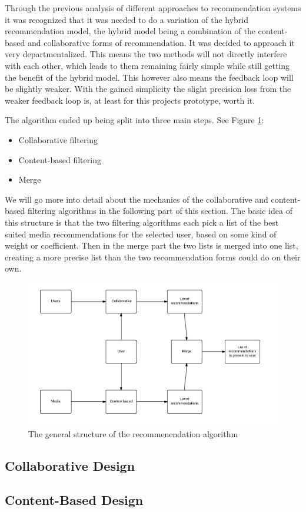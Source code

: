 Through the previous analysis of different approaches to recommendation systems it was recognized that it was needed to do a variation of the hybrid recommendation model, the hybrid model being a combination of the content-based and collaborative forms of recommendation. It was decided to approach it very departmentalized. This means the two methods will not directly interfere with each other, which leads to them remaining fairly simple while still getting the benefit of the hybrid model. This however also means the feedback loop will be slightly weaker. With the gained simplicity the slight precision loss from the weaker feedback loop is, at least for this projects prototype, worth it.

The algorithm ended up being split into three main steps. See Figure \ref{GenRecAlgo}:
\begin{itemize}
	\item Collaborative filtering
	\item Content-based filtering
	\item Merge
\end{itemize}

We will go more into detail about the mechanics of the collaborative and content-based filtering algorithms in the following part of this section. The basic idea of this structure is that the two filtering algorithms each pick a list of the best suited media recommendations for the selected user, based on some kind of weight or coefficient. Then in the merge part the two lists is merged into one list, creating a more precise list than the two recommendation forms could do on their own.

\begin{figure}[H]
\centering
\includegraphics[width=1\textwidth]{Images/RecommendationAlgo.png}
\caption{The general structure of the recommenendation algorithm}
\label{GenRecAlgo}
\end{figure}

\subsection{Collaborative Design}
\label{CollaborativeDes}

\subsection{Content-Based Design}
\label{ContentBasedDes}
